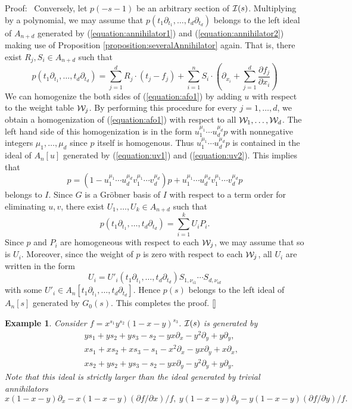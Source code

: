 \documentclass[12pt]{article}
\def\pd#1{ \partial_{#1} }
\def\Isc{ {\cal I} }
\newenvironment{proof}{\par\noindent Proof:\ }{${\tt [}\kern-0.2mm{\tt ]}$}
\newtheorem{example}{Example}[section]
\def\comment#1{  }
\begin{document}
\begin{proof}
Conversely, let $p(-s-1)$ be an arbitrary section of $\Isc(s)$.
Multiplying by a polynomial, we may assume that 
$p(t_1\partial_{t_1},\dots,t_d\partial_{t_d})$ belongs to the left 
ideal of $A_{n+d}$ generated by (\ref{equation:annihilator1}) and 
(\ref{equation:annihilator2}) making use of 
Proposition \ref{proposition:severalAnnihilator}
again.
That is, there exist $R_j,S_i\in A_{n+d}$ such that
\begin{equation} \label{equation:afo1}
p(t_1\partial_{t_1},\dots,t_d\partial_{t_d})
= \sum_{j=1}^d R_j\cdot(t_j - f_j)
+ \sum_{i=1}^n S_i\cdot
\left(\partial_{x_i} + \sum_{j=1}^d\frac{\partial f_j}{\partial x_i}\right)
\end{equation}
We can homogenize the both sides of 
(\ref{equation:afo1}) by adding $u$ 
with respect to the weight table ${\cal W}_j$.  
By performing this procedure for every $j=1,\dots,d$, we obtain 
a homogenization of 
(\ref{equation:afo1}) with respect to all ${\cal W}_1,\dots,{\cal W}_d$.  
The left hand side of this homogenization is in the form 
$u_1^{\mu_1}\cdots u_d^{\mu_d}p$ with nonnegative integers 
$\mu_1,\dots,\mu_d$ since $p$ itself is homogenous.  
Thus $u_1^{\mu_1}\cdots u_d^{\mu_d}p$ is 
contained in the ideal of $A_n[u]$ generated by 
(\ref{equation:uv1}) and (\ref{equation:uv2}).  
This implies that
$$
p = (1-u_1^{\mu_1}\cdots u_d^{\mu_d}v_1^{\mu_1}\cdots v_d^{\mu_d})p
    + u_1^{\mu_1}\cdots u_d^{\mu_d}v_1^{\mu_1}\cdots v_d^{\mu_d}p
$$
belongs to $I$.  Since $G$ is a Gr\"obner basis of $I$ with respect to a term order
for eliminating $u,v$, there exist $U_1,\dots,U_k \in A_{n+d}$ such that
$$
p(t_1\partial_{t_1},\dots,t_d\partial_{t_d}) 
= \sum_{i=1}^k U_iP_i.
$$
Since $p$ and $P_i$ are homogeneous with respect to each ${\cal W}_j$, 
we may assume that so is $U_i$.  
Moreover, since the weight of $p$ is zero with respect to each ${\cal W}_j$, 
all $U_i$ are written in the form
$$
U_i = U'_i(t_1\partial_{t_1},\dots,t_d\partial_{t_d})
      S_{1,\nu_{i1}}\cdots S_{d,\nu_{id}}
$$
with some $U'_i \in A_n[t_1\partial_{t_1},\dots,t_d\partial_{t_d}]$.
Hence $p(s)$ belongs to the left ideal of $A_n[s]$ generated by
$G_0(s)$.  
This completes the proof.
\end{proof}

\begin{example}  \rm \label{example:example4.1}
Consider
$f = x^{s_1} y^{s_2} (1-x-y)^{s_3}$.
$\Isc(s)$ is generated by
\begin{eqnarray*}
 & &y s_1+y s_2+y s_3-s_2-y x \pd{x}-y^2 \pd{y}+y \pd{y} ,  \\
 & &x s_1+x s_2+x s_3-s_1-x^2 \pd{x}-y x \pd{y}+x \pd{x} , \\ 
 & & x s_2+y s_2+y s_3-s_2-y x \pd{y}-y^2 \pd{y}+y \pd{y}.
\end{eqnarray*}
Note that this ideal is strictly larger than the ideal generated by
trivial annihilators
$$ x(1-x-y) \pd{x} - x (1-x-y) (\partial f/\partial x)/f,\ 
   y(1-x-y) \pd{y} - y (1-x-y) (\partial f/\partial y)/f.
$$
\end{example}
\end{document}
